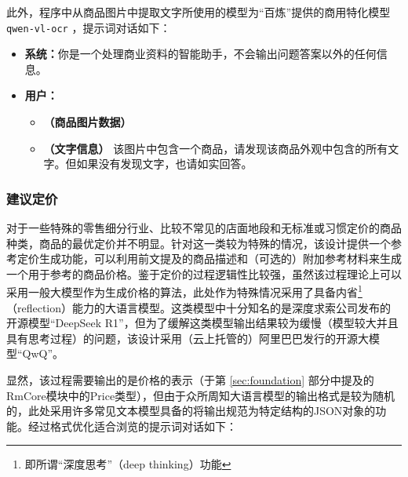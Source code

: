 此外，程序中从商品图片中提取文字所使用的模型为“百炼”提供的商用特化模型 \verb|qwen-vl-ocr| ，提示词对话如下：

\begin{itemize}
    \item[] \textbf{系统：}你是一个处理商业资料的智能助手，不会输出问题答案以外的任何信息。
    \item[] \textbf{用户：}
    \begin{itemize}
        \item[] \textbf{（商品图片数据）}
        \item[] \textbf{（文字信息）} 该图片中包含一个商品，请发现该商品外观中包含的所有文字。但如果没有发现文字，也请如实回答。
    \end{itemize}
\end{itemize}

\subsubsection{建议定价}

对于一些特殊的零售细分行业、比较不常见的店面地段和无标准或习惯定价的商品种类，商品的最优定价并不明显。针对这一类较为特殊的情况，该设计提供一个参考定价生成功能，可以利用前文提及的商品描述和（可选的）附加参考材料来生成一个用于参考的商品价格。鉴于定价的过程逻辑性比较强，虽然该过程理论上可以采用一般大模型作为生成价格的算法，此处作为特殊情况采用了具备内省\footnote{即所谓“深度思考”（deep thinking）功能}（reflection）能力的大语言模型。这类模型中十分知名的是深度求索公司发布的开源模型“DeepSeek R1”，但为了缓解这类模型输出结果较为缓慢（模型较大并且具有思考过程）的问题，该设计采用（云上托管的）阿里巴巴发行的开源大模型“QwQ”。

显然，该过程需要输出的是价格的表示（于第 \ref{sec:foundation} 部分中提及的RmCore模块中的Price类型），但由于众所周知大语言模型的输出格式是较为随机的，此处采用许多常见文本模型具备的将输出规范为特定结构的JSON对象的功能。经过格式优化适合浏览的提示词对话如下：

